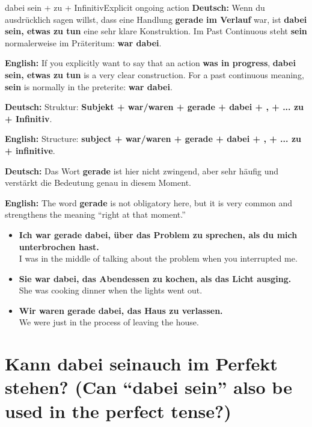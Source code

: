 \documentclass[a4paper,11pt]{article}
\newcommand{\GermanText}[1]{\textbf{Deutsch: }#1\par}
\newcommand{\EnglishText}[1]{{\small\color{SoftGray}\textbf{English: }#1\par}}
\newcommand{\ExampleItem}[2]{\item \textbf{#1}\\{\small\color{SoftGray}#2}}
\begin{document}
        \begin{grammarentry}{dabei sein + zu + Infinitiv}{Explicit ongoing action}
            \GermanText{Wenn du ausdrücklich sagen willst, dass eine Handlung \textbf{gerade im Verlauf} war, ist \textbf{dabei sein, etwas zu tun} eine sehr klare Konstruktion. Im Past Continuous steht \textbf{sein} normalerweise im Präteritum: \textbf{war dabei}.}
            \EnglishText{If you explicitly want to say that an action \textbf{was in progress}, \textbf{dabei sein, etwas zu tun} is a very clear construction. For a past continuous meaning, \textbf{sein} is normally in the preterite: \textbf{war dabei}.}

            \GermanText{Struktur: \textbf{Subjekt + war/waren + gerade + dabei + , + ... zu + Infinitiv}.}
            \EnglishText{Structure: \textbf{subject + war/waren + gerade + dabei + , + ... zu + infinitive}.}

            \GermanText{Das Wort \textbf{gerade} ist hier nicht zwingend, aber sehr häufig und verstärkt die Bedeutung \glqq genau in diesem Moment\grqq.}
            \EnglishText{The word \textbf{gerade} is not obligatory here, but it is very common and strengthens the meaning ``right at that moment.''}
        \end{grammarentry}

        \begin{exbox}
            \begin{itemize}
                \ExampleItem{Ich war gerade dabei, über das Problem zu sprechen, als du mich unterbrochen hast.}{I was in the middle of talking about the problem when you interrupted me.}
                \ExampleItem{Sie war dabei, das Abendessen zu kochen, als das Licht ausging.}{She was cooking dinner when the lights went out.}
                \ExampleItem{Wir waren gerade dabei, das Haus zu verlassen.}{We were just in the process of leaving the house.}
            \end{itemize}
        \end{exbox}

\section{Kann \glqq dabei sein\grqq auch im Perfekt stehen? \textnormal{(Can ``dabei sein'' also be used in the perfect tense?)}}
\end{document}
